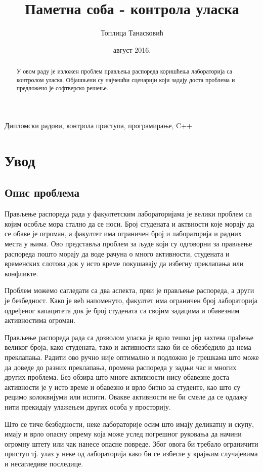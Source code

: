 \documentclass[a4paper, 12pt, diplomski]{etfcyr}
\title{Паметна соба - контрола уласка}
\author{Топлица Танасковић}
\date{август 2016.}
\renewenvironment{justify}{%
	\trivlist
	\justifying
	\itemindent\JustifyingParindent
	\item\relax
}{%
\endtrivlist
}
\begin{document}
	\sloppy
	\maketitle
	\begin{abstract}
		\begin{justify}
			У овом раду је изложен проблем прављења распореда коришћења лабораторија са контролом уласка. Објашњени су најчешћи сценарији који задају доста проблема и предложено је софтверско решење.
		\end{justify}
	\end{abstract}

	\begin{keywords}
		Дипломски радови, контрола приступа, програмирање, C++
	\end{keywords}
	\tableofcontents
	\listoffigures
	\listoftables

	\chapter{Увод}
		
		\section{Опис проблема}
		
		\begin{justify}
			Прављење распореда рада у факултетским лабораторијама је велики проблем са којим особље мора стално да се носи. Број студената и актвности које морају да се обаве је огроман, а факултет има ограничен број и лабораторија и радних места у њима. Ово представља проблем за људе који су одговорни за прављење распореда пошто морају да воде рачуна о много активности, студената и временских слотова док у исто време покушавају да избегну преклапања или конфликте.
		
			Проблем можемо сагледати са два аспекта, први је прављење распореда, а други је безбедност. Како је већ напоменуто, факултет има ограничен број лабораторија одређеног капацитета док је број студената са својим задацима и обавезним активностима огроман.
		
			Прављење распореда рада са дозволом уласка је врло тешко јер захтева праћење великог броја, како студената, тако и активности како би се обезбедило да нема преклапања. Радити ово ручно није оптимално и подложно је грешкама што може да доведе до разних преклапања, промена распореда у задњи час и многих других проблема. Без обзира што многе активности нису обавезне доста активности је у исто време и обавезно и врло битно за студенте, као што су рецимо колоквијуми или испити. Овакве активности не би смеле да се одлажу нити прекидају улажењем других особа у просторију.
		
			Што се тиче безбедности, неке лабораторије осим што имају деликатну и скупу, имају и врло опасну опрему која може услед погрешног руковања да начини огромну штету или чак нанесе опасне повреде. Због овога би требало ограничити приступ тј. улаз у неке од лабораторија како би се избегле у крајњим случајевима и несагледиве последице.
		\end{justify}
	
\end{document}
